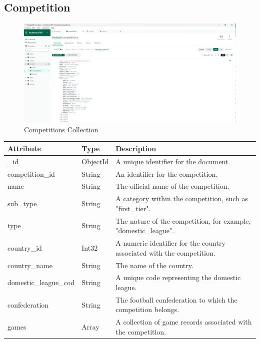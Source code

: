 \documentclass{Configuration_Files/PoliMi3i_thesis}
\begin{document}
\subsection{Competition}
\begin{figure}[htbp]
    \centering
    \includegraphics[scale=0.4]{Images/Dataset/competitions.png}
    \caption{Competitions Collection}
\end{figure}
\begin{tabular}{|l|l|p{8cm}|}
    \hline
    \rowcolor{bluepoli!40}
    \textbf{Attribute}            & \textbf{Type}           & \textbf{Description} \\ \hline
    \_id                          & ObjectId                & A unique identifier for the document. \\ \hline
    competition\_id               & String                  & An identifier for the competition. \\ \hline
    name                          & String                  & The official name of the competition. \\ \hline
    sub\_type                     & String                  & A category within the competition, such as "first\_tier". \\ \hline
    type                          & String                  & The nature of the competition, for example, "domestic\_league". \\ \hline
    country\_id                   & Int32                   & A numeric identifier for the country associated with the competition. \\ \hline
    country\_name                 & String                  & The name of the country. \\ \hline
    domestic\_league\_cod         & String                  & A unique code representing the domestic league. \\ \hline
    confederation                 & String                  & The football confederation to which the competition belongs. \\ \hline
    games                         & Array                   & A collection of game records associated with the competition. \\ \hline
\end{tabular}
\end{document}
